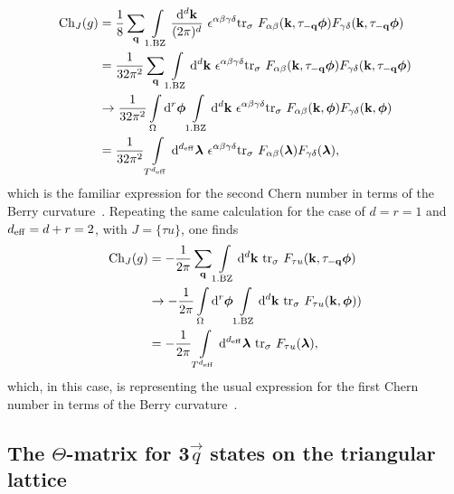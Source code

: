 \documentclass[
    aps,
    prb,
    twocolumn,
    floatfix,
    superscriptaddress,
	10pt
]{revtex4-2}
\begin{document}
\begin{align}
	{\rm Ch}_{J}(g)
	& = \frac{1}{8 }\sum_{\mathbf{q}}
 \int\limits_{\mathrm{1.BZ}} \frac{\mathrm{d}^d \mathbf{k}}{(2\pi)^d}~ \epsilon^{\alpha\beta\gamma\delta}
 \mathrm{tr}_\sigma ~F_{\alpha \beta}(\mathbf{k}, \tau_{-\mathbf{q}}\boldsymbol{\phi}) F_{\gamma\delta}(\mathbf{k}, \tau_{-\mathbf{q}}\boldsymbol{\phi}) 
 \notag \\
 & = \frac{1}{32 \pi^2}\sum_{\mathbf{q}}
 \int\limits_{\mathrm{1.BZ}}\mathrm{d}^d \mathbf{k} ~ \epsilon^{\alpha\beta\gamma\delta}
 \mathrm{tr}_\sigma ~F_{\alpha \beta}(\mathbf{k}, \tau_{-\mathbf{q}}\boldsymbol{\phi}) F_{\gamma\delta}(\mathbf{k}, \tau_{-\mathbf{q}}\boldsymbol{\phi}) 
 \notag \\
 & \to \frac{1}{32 \pi^2} \int\limits_{\Omega} \mathrm{d}^r\boldsymbol{\phi}
 \int\limits_{\mathrm{1.BZ}} \mathrm{d}^d \mathbf{k} ~ \epsilon^{\alpha\beta\gamma\delta}
 \mathrm{tr}_\sigma ~F_{\alpha \beta}(\mathbf{k},\boldsymbol{\phi}) F_{\gamma\delta}(\mathbf{k}, \boldsymbol{\phi}) 
 \notag \\
 & = \frac{1}{32 \pi^2} \int\limits_{T^{{d_\mathrm{eff}}}}  \mathrm{d}^{d_\mathrm{eff}} \boldsymbol{\lambda}
  ~ \epsilon^{\alpha\beta\gamma\delta}
 \mathrm{tr}_\sigma ~F_{\alpha \beta}(\boldsymbol{\lambda}) F_{\gamma\delta}(\boldsymbol{\lambda}) ,
\end{align}
which is the familiar expression for the second Chern number in terms of the Berry curvature~\cite{Qi2008}.
Repeating the same calculation for the case of $d=r=1$ and ${d_\mathrm{eff}} =d+r=2$, with $J=\lbrace \tau u \rbrace $, one finds
\begin{align}
	{\rm Ch}_{J}(g)
 & =- \frac{1}{2 \pi}\sum_{\mathbf{q}}
 \int\limits_{\mathrm{1.BZ}}\mathrm{d}^d \mathbf{k} ~
 \mathrm{tr}_\sigma ~F_{\tau u}(\mathbf{k}, \tau_{-\mathbf{q}}\boldsymbol{\phi}) 
 \notag \\
 & \to -\frac{1}{2 \pi} \int\limits_{\Omega} \mathrm{d}^r\boldsymbol{\phi}
 \int\limits_{\mathrm{1.BZ}} \mathrm{d}^d \mathbf{k} ~
 \mathrm{tr}_\sigma ~F_{\tau u}(\mathbf{k},\boldsymbol{\phi}) ) 
 \notag \\
 & = -\frac{1}{2 \pi} \int\limits_{T^{{d_\mathrm{eff}}}}  \mathrm{d}^{d_\mathrm{eff}} \boldsymbol{\lambda}
  ~
 \mathrm{tr}_\sigma ~F_{\tau u}(\boldsymbol{\lambda})  ,
\end{align}
which, in this case, is representing the usual expression for the first Chern number in terms of the Berry curvature~\cite{Qi2008}. 


\subsection{The \texorpdfstring{$\Theta$-matrix}{Theta-matrix} for \texorpdfstring{3$\vec{q}$}{3q} states on the triangular lattice}
\end{document}

